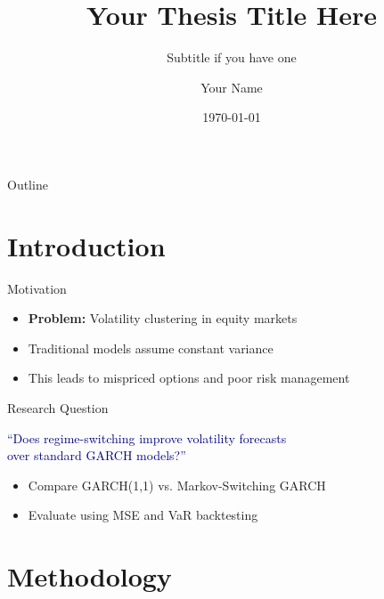 \documentclass[aspectratio=169]{beamer}
\title{Your Thesis Title Here}
\subtitle{Subtitle if you have one}
\author{Your Name}
\institute{Your University \\ \textit{your.email@university.edu}}
\date{\today}
\begin{document}
\begin{frame}
\titlepage
\end{frame}

\begin{frame}{Outline}
\tableofcontents
\end{frame}

\section{Introduction}

\begin{frame}{Motivation}
\begin{itemize}
    \item \textbf{Problem:} Volatility clustering in equity markets
    \item Traditional models assume constant variance
    \item \textcolor{accent}{This leads to mispriced options and poor risk management}
\end{itemize}
\begin{center}
\end{center}
\end{frame}

\begin{frame}{Research Question}
\begin{center}
\Large \textcolor{navy}{``Does regime-switching improve volatility forecasts\\ over standard GARCH models?''}
\end{center}
\vspace{5mm}
\begin{itemize}
    \item Compare GARCH(1,1) vs. Markov-Switching GARCH
    \item Evaluate using \textcolor{accent}{MSE} and \textcolor{accent}{VaR backtesting}
\end{itemize}
\end{frame}

\section{Methodology}
\end{document}
